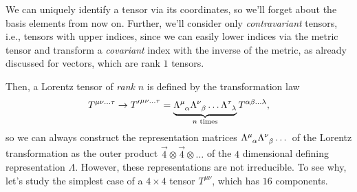 We can uniquely identify a tensor via its coordinates, so we'll forget about the basis elements from now on. Further, we'll consider only \emph{contravariant} tensors, i.e., tensors with upper indices, since we can easily lower indices via the metric tensor and transform a \emph{covariant} index with the inverse of the metric, as already discussed for vectors, which are rank $1$ tensors.

Then, a Lorentz tensor of \emph{rank} $n$ is defined by the transformation law
\begin{equation}\label{eq:lorentz-transf-tensor}
    T^{\mu\nu\dots\tau} \to {T'}^{\mu\nu\dots\tau} = \underbrace{\tensor{\Lambda}{^\mu_\alpha} \tensor{\Lambda}{^\nu_\beta} \dots \tensor{\Lambda}{^\tau_\lambda}}_\text{$n$ times} T^{\alpha\beta\dots\lambda},
\end{equation}
so we can always construct the representation matrices $\tensor{\Lambda}{^\mu_\alpha} \tensor{\Lambda}{^\nu_\beta} \dots$ of the Lorentz transformation as the outer product $\vec{4} \otimes \vec{4} \otimes \dots$ of the $4$ dimensional defining representation $\Lambda$. However, these representations are not irreducible. To see why, let's study the simplest case of a $4 \times 4$ tensor $T^{\mu\nu}$, which has $16$ components.

